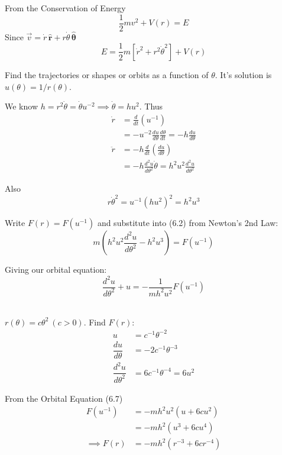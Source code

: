 \documentclass[twoside]{scrartcl}
\let\oldhat\hat
\renewcommand{\hat}[1]{\,\oldhat{\boldsymbol{\mathbf{#1}}}}
\begin{document}
From the Conservation of Energy
\[\frac{1}{2}mv^2 + V(r) = E\]
Since $\vec{v} = \dot{r}\hat{r} + r\dot{\theta}\hat{\theta}$
\begin{equation}\boxed{E = \frac{1}{2}m[\dot{r}^2 + r^2\dot{\theta}^2] + V(r)}\end{equation}
\pagebreak


Find the trajectories or shapes or orbits as a function of $\theta$. It's solution is $u(\theta) = 1/r(\theta)$. 


We know $h = r^2\dot{\theta} = \dot{\theta}u^{-2} \implies \dot{\theta} = hu^2$. Thus
\[\begin{aligned}
\dot{r} &= \frac{d}{dt}(u^{-1})\\
&= -u^{-2}\frac{du}{d\theta}\frac{d\theta}{dt} = -h\frac{du}{d\theta}\\[0.8cm]
\ddot{r} &= -h\frac{d}{dt}\left(\frac{du}{d\theta}\right)\\
&= -h\frac{d^2u}{d\theta^2}\dot{\theta} = h^2u^2\frac{d^2u}{d\theta^2}
\end{aligned}
\]

Also 
\[r\dot{\theta}^2 = u^{-1}(hu^2)^2 = h^2u^3\]


Write $F(r) = F(u^{-1})$ and substitute into (6.2) from Newton's 2nd Law:
\[m\left(h^2u^2\frac{d^2u}{d\theta^2} - h^2u^3\right) = F(u^{-1})\]

Giving our orbital equation:
\begin{equation} \boxed{\frac{d^2u}{d\theta^2} + u = -\frac{1}{mh^2u^2}F(u^{-1})} \end{equation}~

\begin{example}
	$r(\theta) = c\theta^2 ~(c > 0)$. Find $F(r)$:
\[\begin{aligned}
u &= c^{-1}\theta^{-2}\\
\dfrac{du}{d\theta} &= -2c^{-1}\theta^{-3}\\
\dfrac{d^2u}{d\theta^2} &= 6c^{-1}\theta^{-4} = 6u^2
\end{aligned}
\]
	
	From the Orbital Equation (6.7)
	\[\begin{aligned} F(u^{-1}) &= -mh^2u^2(u + 6cu^2)\\ &= -mh^2(u^3 + 6cu^4)\\
	\implies F(r) &= -mh^2(r^{-3} + 6cr^{-4})\end{aligned}\] 
\end{example}

\pagebreak 
\end{document}

